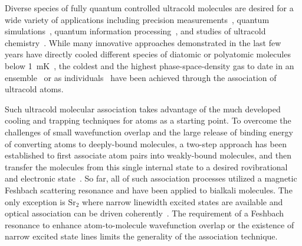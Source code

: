 \documentclass[aps,prl,twocolumn,superscriptaddress]{revtex4-1}
\begin{document}

Diverse species of fully quantum controlled  ultracold molecules are desired for a  wide variety of applications including precision measurements~\cite{Nick_and_Ivan2017}, quantum simulations~\cite{Yao2018}, quantum  information processing~\cite{DeMille2002, Ni2018}, and studies of ultracold chemistry~\cite{Bohn2017,Bala2016,Hu1111}.
While many innovative approaches demonstrated in the last few years have directly cooled different species of diatomic or polyatomic molecules below 1~mK~\cite{Norrgard2016, Mitra1366}, the coldest and the highest phase-space-density gas to date in an ensemble~\cite{Demarco2018} or as individuals~\cite{Zhang2020}  have been achieved through the association of ultracold atoms.

Such ultracold molecular association takes advantage of the much developed cooling and trapping techniques for atoms as a starting point. To overcome the challenges of small wavefunction overlap and the large release of binding energy of converting atoms to deeply-bound molecules, a  two-step approach has been established to first associate atom pairs into weakly-bound molecules, and then transfer the molecules from this single internal state to a desired rovibrational and electronic state~\cite{Danzl2008, Ni2008,Lang2008, Takekoshi2014, Molony2014, Park2015, Guo2016, Kondov2019, Voges2020}.
So far, all of such association processes utilized a magnetic Feshbach scattering resonance and have been applied to bialkali molecules. The only exception is Sr$_2$ where narrow linewidth excited states are available and optical association can be driven coherently~\cite{Reinaudi2012,Stellmer2012}. The requirement of a Feshbach resonance to enhance atom-to-molecule wavefunction overlap or the existence of narrow excited state lines limits the generality of the association technique. %
\end{document}
